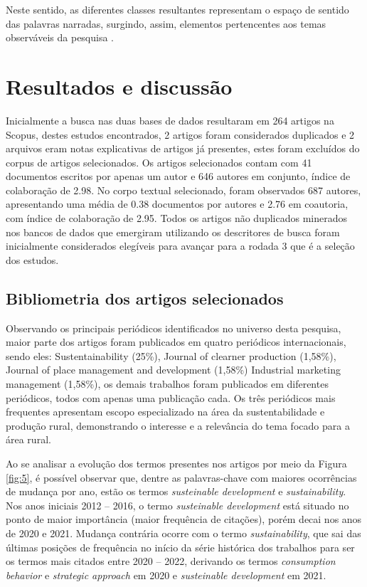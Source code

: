 Neste sentido, as diferentes classes resultantes representam o espaço de sentido das palavras narradas, surgindo, assim, elementos pertencentes aos temas observáveis da pesquisa \cite{Gavasso2016}.

\section{Resultados e discussão}

Inicialmente a busca nas duas bases de dados resultaram em 264 artigos na Scopus, destes estudos encontrados, 2 artigos foram considerados duplicados e 2 arquivos eram notas explicativas de artigos já presentes, estes foram excluídos do corpus de artigos selecionados. Os artigos selecionados contam com 41 documentos escritos por apenas um autor e 646 autores em conjunto, índice de colaboração de 2.98. No corpo textual selecionado, foram observados 687 autores, apresentando uma média de 0.38 documentos por autores e 2.76 em coautoria, com índice de colaboração de 2.95. Todos os artigos não duplicados minerados nos bancos de dados que emergiram utilizando os descritores de busca foram inicialmente considerados elegíveis para avançar para a rodada 3 que é a seleção dos estudos.

\subsection{Bibliometria dos artigos selecionados}

Observando os principais periódicos identificados no universo desta pesquisa, maior parte dos artigos foram publicados em quatro periódicos internacionais, sendo eles: Sustentainability (25\%), Journal of clearner production (1,58\%), Journal of place management and development (1,58\%) Industrial marketing management (1,58\%), os demais trabalhos foram publicados em diferentes periódicos, todos com apenas uma publicação cada. Os três periódicos mais frequentes apresentam escopo especializado na área da sustentabilidade e produção rural, demonstrando o interesse e a relevância do tema focado para a área rural.

Ao se analisar a evolução dos termos presentes nos artigos por meio da Figura \ref{fig:5}, é possível observar que, dentre as palavras-chave com maiores ocorrências de mudança por ano, estão os termos \textit{susteinable development} e \textit{sustainability}. Nos anos iniciais 2012 – 2016, o termo \textit{susteinable development} está situado no ponto de maior importância (maior frequência de citações), porém decai nos anos de 2020 e 2021. Mudança contrária ocorre com o termo \textit{sustainability}, que sai das últimas posições de frequência no início da série histórica dos trabalhos para ser os termos mais citados entre 2020 – 2022, derivando os termos \textit{consumption behavior} e \textit{strategic approach} em 2020 e \textit{susteinable development} em 2021.


